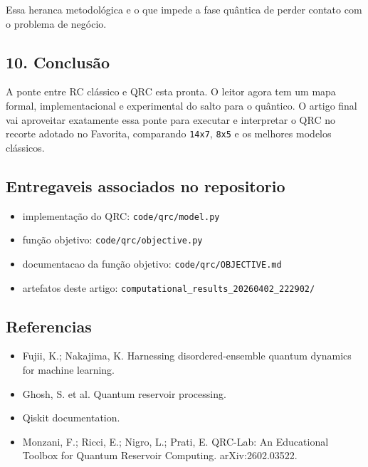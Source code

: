 \documentclass[12pt]{article}
\providecommand{\tightlist}{%
  \setlength{\itemsep}{0pt}\setlength{\parskip}{0pt}}
\begin{document}
Essa heranca metodológica e o que impede a fase quântica de perder contato com o problema de negócio.

\subsection{10. Conclusão}\label{10-conclusuxe3o}

A ponte entre RC clássico e QRC esta pronta. O leitor agora tem um mapa formal, implementacional e experimental do salto para o quântico. O artigo final vai aproveitar exatamente essa ponte para executar e interpretar o QRC no recorte adotado no Favorita, comparando \texttt{14x7}, \texttt{8x5} e os melhores modelos clássicos.

\subsection{Entregaveis associados no repositorio}\label{entregaveis-associados-no-repositorio}

\begin{itemize}
\tightlist
\item
  implementação do QRC: \texttt{code/qrc/model.py}
\item
  função objetivo: \texttt{code/qrc/objective.py}
\item
  documentacao da função objetivo: \texttt{code/qrc/OBJECTIVE.md}
\item
  artefatos deste artigo: \texttt{computational\_results\_20260402\_222902/}
\end{itemize}

\subsection{Referencias}\label{referencias}

\begin{itemize}
\tightlist
\item
  Fujii, K.; Nakajima, K. Harnessing disordered-ensemble quantum dynamics for machine learning.
\item
  Ghosh, S. et al. Quantum reservoir processing.
\item
  Qiskit documentation.
\item
  Monzani, F.; Ricci, E.; Nigro, L.; Prati, E. QRC-Lab: An Educational Toolbox for Quantum Reservoir Computing. arXiv:2602.03522.
\end{itemize}
\end{document}
